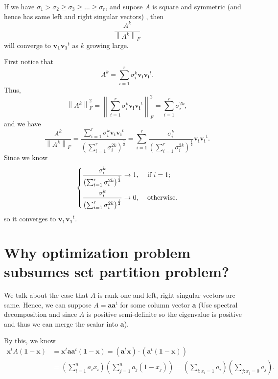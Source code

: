 \begin{claim}
  If we have \(\sigma _1 > \sigma _2 \geq \sigma _3 \geq \dots \geq \sigma _r\), and supose \(A\) is square and symmetric (and hence has same left and right singular vectors)  , then 
  \[
    \frac{A^k}{\left\lVert A^k \right\rVert _F }
  \] will converge to \(\mathbf{v_1} \mathbf{v_1}^t  \) as \(k\) growing large. 
\end{claim}
\begin{explanation}
  First notice that 
  \[
    A^k = \sum_{i=1}^r \sigma _i^k \mathbf{v_i} \mathbf{v_i}^t. 
  \]
  Thus, 
  \[
    \left\lVert A^k \right\rVert _F^2 = \left\lVert \sum_{i=1}^r \sigma _i^k \mathbf{v_i} \mathbf{v_i}^t \right\rVert _F^2 = \sum_{i=1} ^r \sigma _i^{2k},
  \]
  and we have 
  \[
    \frac{A^k}{\left\lVert A^k \right\rVert _F} = \frac{\sum_{i=1}^r \sigma _i^k \mathbf{v_i} \mathbf{v_i}^t}{\left( \sum_{i=1} ^r \sigma _i^{2k} \right)^{\frac{1}{2}} } = \sum_{i=1}^{r} \frac{\sigma _i^k}{\left( \sum_{i=1} ^r \sigma _i^{2k} \right)^{\frac{1}{2}}} \mathbf{v_i} \mathbf{v_i}^t.
  \]
  Since we know 
  \[
    \begin{dcases}
     \frac{\sigma _i^k}{\left( \sum_{i=1} ^r \sigma _i^{2k} \right)^{\frac{1}{2}}} \to 1 , &\text{ if } i = 1  ;\\
      \frac{\sigma _i^k}{\left( \sum_{i=1} ^r \sigma _i^{2k} \right)^{\frac{1}{2}}} \to 0, &\text{ otherwise} .
    \end{dcases}
  \]
  so it converges to \(\mathbf{v_1} \mathbf{v_1}^t  \). 
\end{explanation}

\section{Why optimization problem subsumes set partition problem?} \label{appendix: optmization problem set partition}

We talk about the case that \(A\) is rank one and left, right singular vectors are same. 
Hence, we can suppose \(A = \mathbf{a} \mathbf{a} ^t\) for some column vector \(\mathbf{a} \) (Use spectral decomposition and since \(A\) is positive semi-definite so the eigenvalue is positive and thus we can merge the scalar into \(\mathbf{a} \)).

By this, we know 
\begin{align*}
  \mathbf{x}^t A (\mathbf{1} - \mathbf{x}  ) &= \mathbf{x} ^t \mathbf{a} \mathbf{a} ^t (\mathbf{1} - \mathbf{x}) = \left( \mathbf{a} ^t \mathbf{x}  \right) \cdot \left( \mathbf{a} ^t ( \mathbf{1} - \mathbf{x}  ) \right) \\
  &= \left( \sum_{i=1}^n a_i x_i  \right) \left( \sum_{j=1}^n a_j (1 - x_j)  \right) = \left( \sum_{i: x_i = 1} a_i  \right) \left( \sum_{j: x_j = 0} a_j \right).      
\end{align*}

